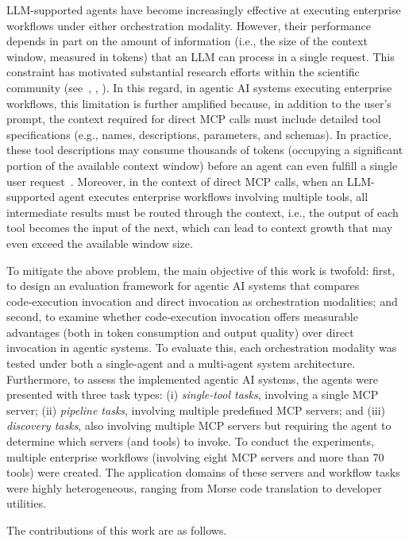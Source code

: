 \documentclass[runningheads]{llncs}
\begin{document}
LLM-supported agents have become increasingly effective at executing enterprise workflows under either orchestration modality. However, their performance depends in part on the amount of information (i.e., the size of the context window, measured in tokens) that an LLM can process in a single request. This constraint has motivated substantial research efforts within the scientific community (see~\cite{an2024make}, \cite{wu2024extending}, \cite{ratner2023parallel}). In this regard, in agentic AI systems executing enterprise workflows, this limitation is further amplified because, in addition to the user’s prompt, the context required for direct MCP calls must include detailed tool specifications (e.g., names, descriptions, parameters, and schemas). In practice, these tool descriptions may consume thousands of tokens (occupying a significant portion of the available context window) before an agent can even fulfill a single user request~\cite{anthropic_mcp_code_execution_2025}. Moreover, in the context of direct MCP calls, when an LLM-supported agent executes enterprise workflows involving multiple tools, all intermediate results must be routed through the context, i.e., the output of each tool becomes the input of the next, which can lead to context growth that may even exceed the available window size. 

To mitigate the above problem, the main objective of this work is twofold: first, to design an evaluation framework for agentic AI systems that compares code‑execution invocation and direct invocation as orchestration modalities; and second, to examine whether code‑execution invocation offers measurable advantages (both in token consumption and output quality) over direct invocation in agentic systems. To evaluate this, each orchestration modality was tested under both a single-agent and a multi-agent system architecture. Furthermore, to assess the implemented agentic AI systems, the agents were presented with three task types: (i) \textit{single-tool tasks}, involving a single MCP server; (ii) \textit{pipeline tasks}, involving multiple predefined MCP servers; and (iii) \textit{discovery tasks}, also involving multiple MCP servers but requiring the agent to determine which servers (and tools) to invoke. To conduct the experiments, multiple enterprise workflows (involving eight MCP servers and more than 70 tools) were created. The application domains of these servers and workflow tasks were highly heterogeneous, ranging from Morse code translation to developer utilities.

The contributions of this work are as follows.
\end{document}
